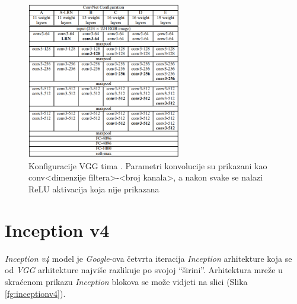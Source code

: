 \documentclass[times, utf8, proizvoljni, numeric]{fer}
\begin{document}
\begin{figure}[!ht]
	\begin{center}
		\captionsetup{justification=centering}
		\includegraphics[width=0.6\textwidth]{./imgs/vgg.png}
		\caption{Konfiguracije VGG tima \cite{VGG}. Parametri konvolucije su prikazani kao conv<dimenzije filtera>-<broj kanala>, a nakon svake se nalazi ReLU aktivacija koja nije prikazana}
		\label{fg:vgg}
	\end{center}
\end{figure}

\section{Inception v4}

\textit{Inception v4} model je \textit{Google}-ova četvrta iteracija \textit{Inception} arhitekture koja se od \textit{VGG} arhitekture najviše razlikuje po svojoj “širini”.  Arhitektura mreže u skraćenom prikazu \textit{Inception} blokova se može vidjeti na slici (Slika \ref{fg:inceptionv4}). 
\end{document}
